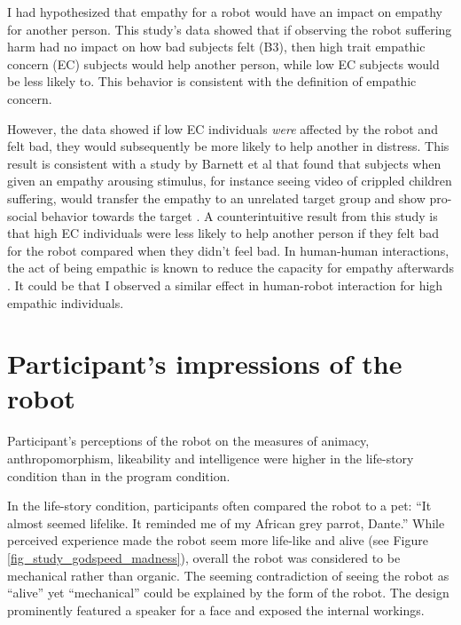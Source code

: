 I had hypothesized that empathy for a robot would have an impact on empathy for another person. This study's data showed that if observing the robot suffering harm had no impact on how bad subjects felt (B3), then high trait empathic concern (EC) subjects would help another person, while low EC subjects would be less likely to. This behavior is consistent with the definition of empathic concern. 

However, the data showed if low EC individuals \emph{were} affected by the robot and felt bad, they would subsequently be more likely to help another in distress. This result is consistent with a study by Barnett et al that found that subjects when given an empathy arousing stimulus, for instance seeing video of crippled children suffering, would transfer the empathy to an unrelated target group and show pro-social behavior towards the target \cite{barnett_empathy_transfer}. 
A counterintuitive result from this study is that high EC individuals were less likely to help another person if they felt bad for the robot compared when they didn't feel bad.  In human-human interactions, the act of being empathic is known to reduce the capacity for empathy afterwards \cite{figley_compassion_fatigue_therapists}. It could be that I observed a similar effect in human-robot interaction for high empathic individuals. 


\section{Participant's impressions of the robot}

Participant's perceptions of the robot on the measures of animacy, anthropomorphism, likeability and intelligence were higher in the life-story condition than in the program condition. 

In the life-story condition, participants often compared the robot to a pet: ``It almost seemed lifelike.  It reminded me of my African grey parrot, Dante.'' While perceived experience made the robot seem more life-like and alive (see Figure \ref{fig_study_godspeed_madness}), overall the robot was considered to be mechanical rather than organic. The seeming contradiction of seeing the robot as ``alive'' yet ``mechanical'' could be explained by the form of the robot. The design prominently featured a speaker for a face and exposed the internal workings.

